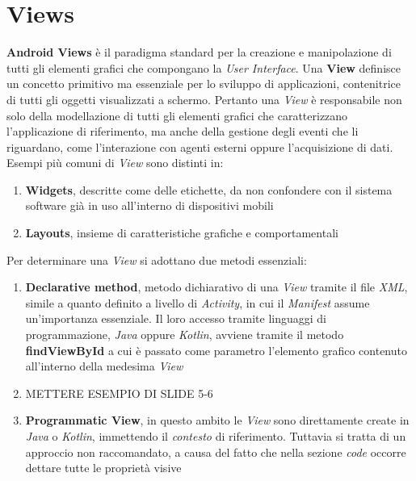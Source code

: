 \documentclass{article}
\begin{document}
\pagestyle{empty}

\section*{Views}
\large
\textbf{Android Views} è il paradigma standard per la creazione e manipolazione di tutti gli elementi grafici che compongano la \textit{User Interface}. Una \textbf{View} definisce un concetto primitivo ma essenziale per lo sviluppo di applicazioni, contenitrice di tutti gli oggetti visualizzati a schermo. Pertanto una \textit{View} è responsabile non solo della modellazione di tutti gli elementi grafici che caratterizzano l'applicazione di riferimento, ma anche della gestione degli eventi che li riguardano, come l'interazione con agenti esterni oppure l'acquisizione di dati.\vspace*{14pt}\\
Esempi più comuni di \textit{View} sono distinti in:
\begin{enumerate}
  \itemsep0em
  \renewcommand{\labelenumi}{-}
  \item \textbf{Widgets}, descritte come delle etichette, da non confondere con il sistema software già in uso all'interno di dispositivi mobili
  \item \textbf{Layouts}, insieme di caratteristiche grafiche e comportamentali    
\end{enumerate} 
Per determinare una \textit{View} si adottano due metodi essenziali:
\begin{enumerate}
  \itemsep0em
  \renewcommand{\labelenumi}{-}
  \item \textbf{Declarative method}, metodo dichiarativo di una \textit{View} tramite il file \textit{XML}, simile a quanto definito a livello di \textit{Activity}, in cui il \textit{Manifest} assume un'importanza essenziale. Il loro accesso tramite linguaggi di programmazione, \textit{Java} oppure \textit{Kotlin}, avviene tramite il metodo \textbf{findViewById} a cui è passato come parametro l'elemento grafico contenuto all'interno della medesima \textit{View}
  \item METTERE ESEMPIO DI SLIDE 5-6 
  \item \textbf{Programmatic View}, in questo ambito le \textit{View} sono direttamente create in \textit{Java} o \textit{Kotlin}, immettendo il \textit{contesto} di riferimento. Tuttavia si tratta di un approccio non raccomandato, a causa del fatto che nella sezione \textit{code} occorre dettare tutte le proprietà visive        
\end{enumerate} 
\end{document}
